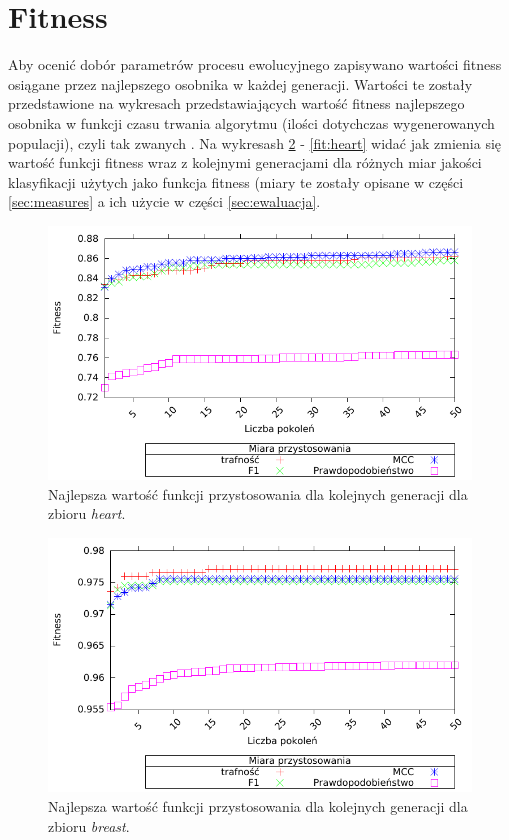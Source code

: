 \FloatBarrier
\section{Fitness}
Aby ocenić dobór parametrów procesu ewolucyjnego zapisywano wartości fitness osiągane przez najlepszego osobnika w każdej generacji. Wartości te zostały przedstawione na wykresach przedstawiających wartość fitness najlepszego osobnika w funkcji czasu trwania algorytmu (ilości dotychczas wygenerowanych populacji), czyli tak zwanych . Na wykresash \ref{fig:fit-breast} - \ref{fit:heart} widać jak zmienia się wartość funkcji fitness wraz z kolejnymi generacjami dla różnych miar jakości klasyfikacji użytych jako funkcja fitness (miary te zostały opisane w części \ref{sec:measures} a ich użycie w części \ref{sec:ewaluacja}.

	\begin{figure}
		\includegraphics[scale=0.90]{figures/results/fitness/fitness-heart}
		\caption{Najlepsza wartość funkcji przystosowania dla kolejnych generacji dla zbioru \emph{heart}.\label{fig:fit-heart}}
	\end{figure}
	
	\begin{figure}
		\includegraphics[scale=0.90]{figures/results/fitness/fitness-breast}
		\caption{Najlepsza wartość funkcji przystosowania dla kolejnych generacji dla zbioru \emph{breast}.\label{fig:fit-breast}}
	\end{figure}	

